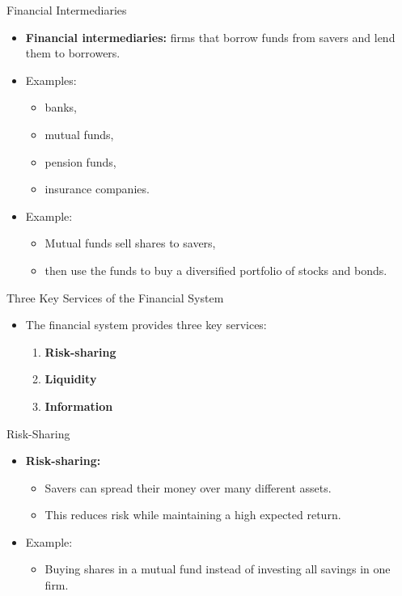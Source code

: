\documentclass[aspectratio=169]{beamer}
\begin{document}
\begin{frame}{Financial Intermediaries}
\transfade
\begin{itemize}
  \item \textbf{Financial intermediaries:} firms that borrow funds from savers and lend them to borrowers.
  \item Examples:
  \begin{itemize}
    \item banks,
    \item mutual funds,
    \item pension funds,
    \item insurance companies.
  \end{itemize}
  \item Example:
  \begin{itemize}
    \item Mutual funds sell shares to savers,
    \item then use the funds to buy a diversified portfolio of stocks and bonds.
  \end{itemize}
\end{itemize}
\end{frame}

\begin{frame}{Three Key Services of the Financial System}
\transfade
\begin{itemize}
  \item The financial system provides three key services:
  \begin{enumerate}
    \item \textbf{Risk-sharing}
    \item \textbf{Liquidity}
    \item \textbf{Information}
  \end{enumerate}
\end{itemize}
\end{frame}

\begin{frame}{Risk-Sharing}
\transfade
\begin{itemize}
  \item \textbf{Risk-sharing:}
  \begin{itemize}
    \item Savers can spread their money over many different assets.
    \item This reduces risk while maintaining a high expected return.
  \end{itemize}
  \item Example:
  \begin{itemize}
    \item Buying shares in a mutual fund instead of investing all savings in one firm.
  \end{itemize}
\end{itemize}
\end{frame}
\end{document}
